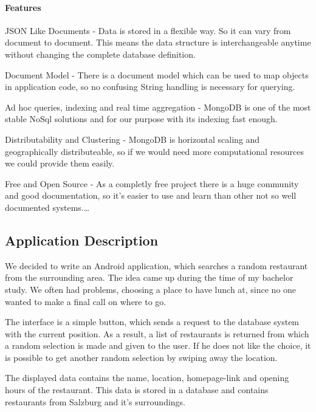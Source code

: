 \paragraph{Features} 

\begin{packed_enum}
    \item JSON Like Documents - Data is stored in a flexible way. So it can vary from document to document. This means the data structure is interchangeable anytime without changing the complete database definition.
    \item Document Model - There is a document model which can be used to map objects in application code, so no confusing String handling is necessary for querying.
    \item Ad hoc queries, indexing and real time aggregation - MongoDB is one of the most stable NoSql solutions and for our purpose with its indexing fast enough.
    \item Distributability and Clustering - MongoDB is horizontal scaling and geographically distributeable, so if we would need more computational resources we could provide them easily. 
    \item Free and Open Source - As a completly free project there is a huge community and good documentation, so it's easier to use and learn than other not so well documented systems.\ldots
\end{packed_enum}

\subsection{Application Description}

We decided to write an Android application, which searches a random restaurant from the surrounding area. The idea came up during the time of my bachelor study. We often had problems, choosing a place to have lunch at, since no one wanted to make a final call on where to go.

The interface is a simple button, which sends a request to the database system with the current position. As a result, a list of restaurants is returned from which a random selection is made and given to the user. If he does not like the choice, it is possible to get another random selection by swiping away the location.

The displayed data contains the name, location, homepage-link and opening hours of the restaurant. This data is stored in a database and contains restaurants from Salzburg and it's surroundings. 

